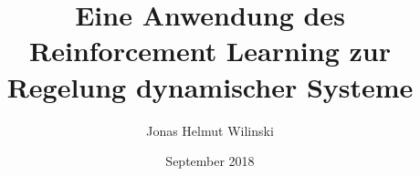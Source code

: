 \documentclass[graybox,envcountchap,twoside,deutsch]{lrt_thesis}
\begin{document}
%
\author{Jonas Helmut Wilinski}
\title{Eine Anwendung des Reinforcement Learning zur Regelung dynamischer Systeme}
\date{September 2018}
\maketitle

\fronttitle
\frontmatter
\tableofcontents
\mainmatter


\graphicspath{{figures/}}














\finalmatter
\end{document}
